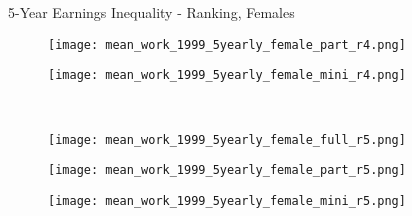 \documentclass[hyperref={bookmarks=false}]{beamer}
\begin{document}
\begin{appendix}
\begin{frame}{5-Year Earnings Inequality - Ranking, Females}
\begin{figure}[!t]
\begin{minipage}[b]{0.15\textwidth}{}
\centering
\texttt{[image: mean\_work\_1999\_5yearly\_female\_part\_r4.png]}
\end{minipage}
\begin{minipage}[b]{0.15\textwidth}{}
\centering
\texttt{[image: mean\_work\_1999\_5yearly\_female\_mini\_r4.png]}
\end{minipage}\\
\begin{minipage}[b]{0.15\textwidth}{}
\centering
\texttt{[image: mean\_work\_1999\_5yearly\_female\_full\_r5.png]}
\end{minipage}
\begin{minipage}[b]{0.15\textwidth}{}
\centering
\texttt{[image: mean\_work\_1999\_5yearly\_female\_part\_r5.png]}
\end{minipage}
\begin{minipage}[b]{0.15\textwidth}{}
\centering
\texttt{[image: mean\_work\_1999\_5yearly\_female\_mini\_r5.png]}
\end{minipage}\\
\end{figure}
\end{frame}


\end{appendix}
\end{document}

